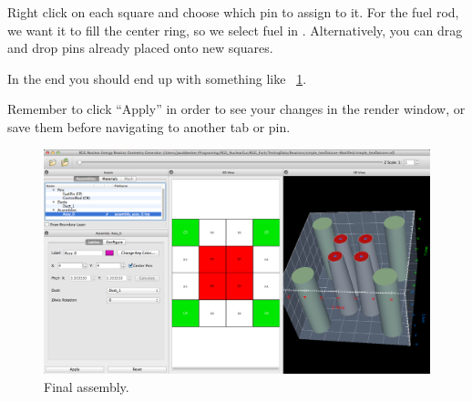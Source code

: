 Right click on each square and choose which pin to assign to it.  For the fuel rod, we want it to fill the center ring, so we select fuel in .  Alternatively, you can drag and drop pins already placed onto new squares.

In the end you should end up with something like ~\ref{fig:Rect10}.

Remember to click ``Apply'' in order to see your changes in the render window, or save them before navigating to another tab or pin.

\begin{figure}[htb]
\begin{center}
\includegraphics[width=0.7\linewidth]{Images/rect-final-assy1.png}
\caption{Final assembly.}
\label{fig:Rect10}
\end{center}
\end{figure}

